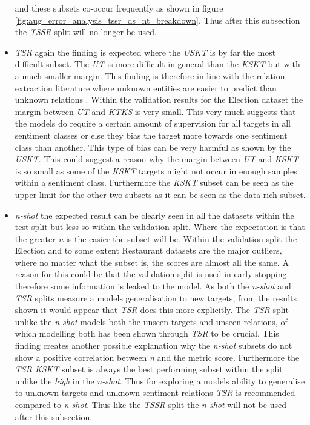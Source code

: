\begin{itemize}
and these subsets co-occur frequently as shown in figure \ref{fig:aug_error_analysis_tssr_ds_nt_breakdown}. Thus after this subsection the \textit{TSSR} split will no longer be used. 
    \item \textit{TSR} again the finding is expected where the \textit{USKT} is by far the most difficult subset. The \textit{UT} is more difficult in general than the \textit{KSKT} but with a much smaller margin. This finding is therefore in line with the relation extraction literature where unknown entities are easier to predict than unknown relations \citep{aug_levy-etal-2017-zero,aug_abdou2019x}. Within the validation results for the Election dataset the margin between \textit{UT} and \textit{KTKS} is very small. This very much suggests that the models do require a certain amount of supervision for all targets in all sentiment classes or else they bias the target more towards one sentiment class than another. This type of bias can be very harmful as shown by the \textit{USKT}. This could suggest a reason why the margin between \textit{UT} and \textit{KSKT} is so small as some of the \textit{KSKT} targets might not occur in enough samples within a sentiment class. Furthermore the \textit{KSKT} subset can be seen as the upper limit for the other two subsets as it can be seen as the data rich subset.
    \item \textit{n-shot} the expected result can be clearly seen in all the datasets within the test split but less so within the validation split. Where the expectation is that the greater \textit{n} is the easier the subset will be. Within the validation split the Election and to some extent Restaurant datasets are the major outliers, where no matter what the subset is, the scores are almost all the same. A reason for this could be that the validation split is used in early stopping therefore some information is leaked to the model. As both the \textit{n-shot} and \textit{TSR} splits measure a models generalisation to new targets, from the results shown it would appear that \textit{TSR} does this more explicitly. The \textit{TSR} split unlike the \textit{n-shot} models both the unseen targets and unseen relations, of which modelling both has been shown through \textit{TSR} to be crucial. This finding creates another possible explanation why the \textit{n-shot} subsets do not show a positive correlation between \textit{n} and the metric score. Furthermore the \textit{TSR KSKT} subset is always the best performing subset within the split unlike the \textit{high} in the \textit{n-shot}. Thus for exploring a models ability to generalise to unknown targets and unknown sentiment relations \textit{TSR} is recommended compared to \textit{n-shot}. Thus like the \textit{TSSR} split the \textit{n-shot} will not be used after this subsection.
\end{itemize}

